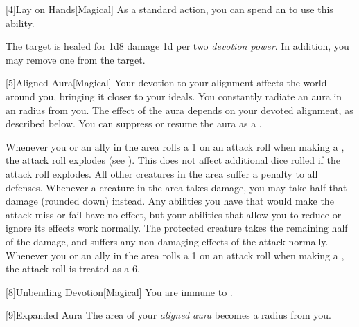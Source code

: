             [4]{Lay on Hands}[Magical] As a standard action, you can spend an  to use this ability.
            \begin{ability}
                \begin{spelltargetinginfo}
                \end{spelltargetinginfo}
                \begin{spelleffects}
                    \spelleffect The target is healed for 1d8 damage \add 1d per two \textit{devotion power}.
                    In addition, you may remove one  from the target.
                \end{spelleffects}
            \end{ability}

            [5]{Aligned Aura}[Magical]
            Your devotion to your alignment affects the world around you, bringing it closer to your ideals.
            You constantly radiate an aura in an \areamed radius  from you.
            The effect of the aura depends on your devoted alignment, as described below.
            You can suppress or resume the aura as a .

             Whenever you or an ally in the area rolls a 1 on an attack roll when making a , the attack roll explodes (see ).
            This does not affect additional dice rolled if the attack roll explodes.
             All other creatures in the area suffer a  penalty to all defenses.
             Whenever a creature in the area takes damage, you may take half that damage (rounded down) instead.
            Any abilities you have that would make the attack miss or fail have no effect, but your abilities that allow you to reduce or ignore its effects work normally.
            The protected creature takes the remaining half of the damage, and suffers any non-damaging effects of the attack normally.
             Whenever you or an ally in the area rolls a 1 on an attack roll when making a , the attack roll is treated as a 6.

            [8]{Unbending Devotion}[Magical]
            You are immune to  .

            [9]{Expanded Aura}
            The area of your \textit{aligned aura} becomes a \arealarge radius  from you.

